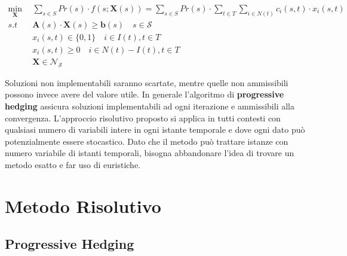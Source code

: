 \documentclass[
]{article}
\begin{document}
\begin{equation*}
    \begin{split} \min_{\mathbf{X}}\:\:& \sum_{s\in S} Pr(s) \cdot f(s;\mathbf{X}(s)) = \sum_{s\in S} Pr(s) \cdot \sum_{t\in T} \sum_{i \in N(t)} c_i(s,t) \cdot x_i(s,t)\\
s.t \quad & \mathbf{A}(s)\cdot \mathbf{X}(s)\geq \mathbf{b}(s) \quad s \in \mathcal{S}\\
& x_i(s,t) \in \{0,1\}\quad i \in I(t), t \in T\\
& x_i(s,t) \geq 0 \quad i\in N(t)-I(t), t \in T\\
&\mathbf{X} \in \mathcal{N}_{\mathcal{S}}
\end{split}
\end{equation*}

Soluzioni non implementabili saranno scartate, mentre quelle non
ammissibili possono invece avere del valore utile. In generale
l'algoritmo di \textbf{progressive hedging} assicura soluzioni
implementabili ad ogni iterazione e ammissibili alla convergenza. L'approccio risolutivo proposto si applica in tutti contesti con
qualsiasi numero di variabili intere in ogni istante temporale e dove
ogni dato può potenzialmente essere stocastico. Dato che il metodo può
trattare istanze con numero variabile di istanti temporali, bisogna
abbandonare l'idea di trovare un metodo esatto e far uso di euristiche.

\hypertarget{metodo-risolutivo}{%
\section{Metodo Risolutivo}\label{metodo-risolutivo}}

\hypertarget{progressive-hedging}{%
\subsection{Progressive Hedging}\label{progressive-hedging}}
\end{document}
